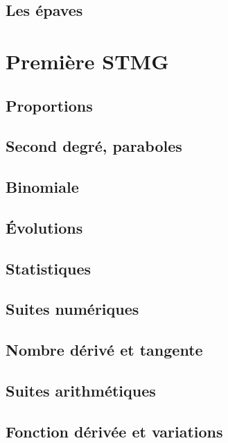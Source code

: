 \documentclass[a4paper,12pt]{book}
\begin{document}
\chapter{Les épaves}


\part{Première STMG}
\chapter{Proportions}


\chapter{Second degré, paraboles}


\chapter{Binomiale}


\chapter{Évolutions}


\chapter{Statistiques}


\chapter{Suites numériques}


\chapter{Nombre dérivé et tangente}


\chapter{Suites arithmétiques}


\chapter{Fonction dérivée et variations}

\end{document}
